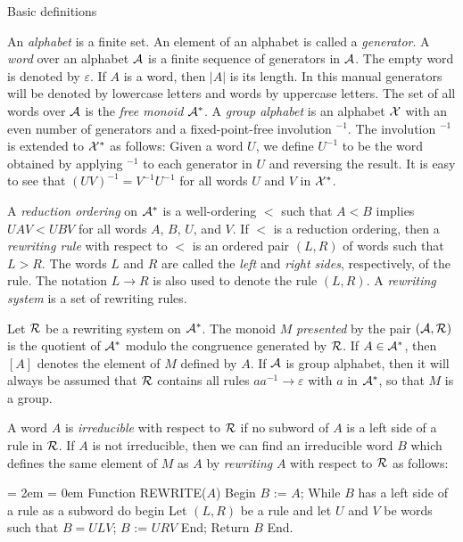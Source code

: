 \bigskip

 Basic definitions

\nobreak

An {\it alphabet\/} is a finite set.  An element of an alphabet is
called a {\it generator}.  A {\it word\/} over an alphabet ${\cal A}$
is a finite sequence of generators in ${\cal A}$.  The empty word is
denoted by $\varepsilon$.  If $A$ is a word, then $|A|$ is its length.
In this manual generators will be denoted by lowercase letters and
words by uppercase letters.  The set of all words over ${\cal A}$ is
the {\it free monoid\/} ${\cal A}^*$.  A {\it group alphabet} is an
alphabet ${\cal X}$ with an even number of generators and a fixed-point-free
involution ${}^{-1}$.  The involution ${}^{-1}$ is extended to ${\cal
X}^*$ as follows:  Given a word $U$, we define $U^{-1}$ to be the word
obtained by applying ${}^{-1}$ to each generator in $U$ and reversing
the result.  It is easy to see that $(UV)^{-1} = V^{-1}U^{-1}$ for all
words $U$ and $V$ in ${\cal X}^*$.

A {\it reduction ordering\/} on ${\cal A}^*$ is a well-ordering $<$
such that $A<B$ implies $UAV<UBV$ for all words $A$, $B$, $U$, and
$V$.  If $<$ is a reduction ordering, then a {\it rewriting rule\/}
with respect to $<$ is an ordered pair $(L,R)$ of words such that
$L>R$.  The words $L$ and $R$ are called the {\it left\/} and {\it
right sides\/}, respectively, of the rule.  The notation $L\to R$ is
also used to denote the rule $(L,R)$.  A {\it rewriting system\/} is a
set of rewriting rules.

Let ${\cal R}$ be a rewriting system on ${\cal A}^*$.  The monoid $M$
{\it presented\/} by the pair $({\cal A,R})$ is the quotient of ${\cal
A}^*$ modulo the congruence generated by ${\cal R}$.  If $A\in {\cal
A}^*$, then $[A]$ denotes the element of $M$ defined by $A$.  If
${\cal A}$ is group alphabet, then it will always be assumed that
${\cal R}$ contains all rules $aa^{-1}\to\varepsilon$ with $a$ in
${\cal A}^*$, so that $M$ is a group.

A word $A$ is {\it irreducible\/} with respect to ${\cal R}$ if no
subword of $A$ is a left side of a rule in ${\cal R}$.  If $A$ is not
irreducible, then we can find an irreducible word $B$ which defines
the same element of $M$ as $A$ by {\it rewriting\/} $A$ with respect
to ${\cal R}$ as follows:

\medskip

{\parindent = 2em \parskip = 0em \obeylines
\ind Function REWRITE($A$)
\nobreak
\ind Begin
\indb  $B$ := $A$;
\smallskip
\indb  While $B$ has a left side of a rule as a subword do begin
\indc    Let $(L,R)$ be a rule and let $U$ and $V$ be words such that $B = ULV$;
\indc    $B$ := $URV$
\indb  End;
\smallskip
\indb  Return $B$
\nobreak
\ind End.}

